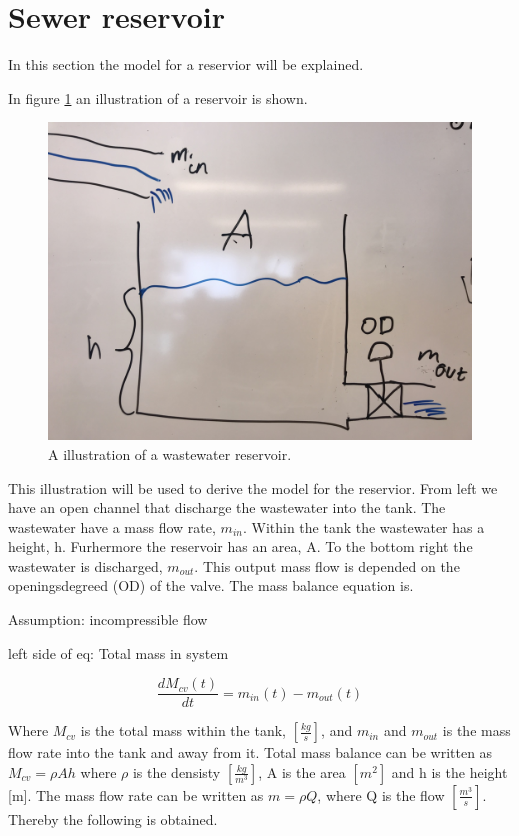 \section{Sewer reservoir}\label{se:sewer_reservoir}
In this section the model for a reservior will be explained. 

In figure \ref{fig:tank_model} an illustration of a reservoir is shown.
\begin{figure}[H]
\centering
\includegraphics[width=.6\textwidth]{report/modeling/pictures/tank_model.jpg}
\caption{A illustration of a wastewater reservoir.}
\label{fig:tank_model}
\end{figure} 

This illustration will be used to derive the model for the reservior. From left we have an open channel that discharge the wastewater into the tank. The wastewater have a mass flow rate, $m_{in}$. Within the tank the wastewater has a height, h. Furhermore the reservoir has an area, A. To the bottom right the wastewater is discharged, $m_{out}$. This output mass flow is depended on the openingsdegreed (OD) of the valve. The mass balance equation is.

Assumption: incompressible flow

left side of eq: Total mass in system

\begin{equation}
	 	\frac{dM_{cv}(t)}{dt}=m_{in}(t)-m_{out}(t)
\end{equation} 

Where $M_{cv}$ is the total mass within the tank, $\left[\frac{kg}{s}\right]$, and $m_{in}$ and $m_{out}$ is the mass flow rate into the tank and away from it. Total mass balance can be written as $M_{cv} = \rho Ah$ where $\rho$ is the densisty $\left[\frac{kg}{m^3}\right]$, A is the area $\left[m^2\right]$ and h is the height [m]. The mass flow rate can be written as $m = \rho Q$, where Q is the flow $\left[\frac{m^3}{s}\right]$. Thereby the following is obtained.

